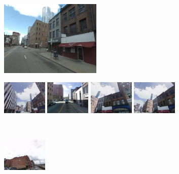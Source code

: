 \begin{figure}[h]
\begin{minipage}{0.75\linewidth}
\begin{minipage}{\linewidth}
          \end{minipage} 
      \end{minipage}
      \vspace{3mm}
      \\
      \begin{minipage}{0.34\linewidth}
          \centering
          \vspace{0mm}
          \includegraphics[height=36mm]{imgs/ex4/query.jpg}
      \end{minipage}
      \begin{minipage}{0.75\linewidth}
          \begin{minipage}{\linewidth} 
              \colorbox{myGreen}{\includegraphics[height=16mm]{imgs/ex4/FVsvm1.jpg}}
              \colorbox{myRed}{\includegraphics[height=16mm]{imgs/ex4/FVsvm2.jpg}}
              \colorbox{myGreen}{\includegraphics[height=16mm]{imgs/ex4/FVsvm5.jpg}}
              \colorbox{myGreen}{\includegraphics[height=16mm]{imgs/ex4/FVsvm4.jpg}}
          \end{minipage}
          \\
          \begin{minipage}{\linewidth}
              \colorbox{myRed}{\includegraphics[height=16mm]{imgs/ex4/FV1.jpg}}

\end{minipage}
\end{minipage}
\end{figure}
